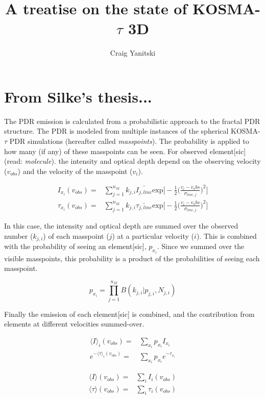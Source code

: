 \documentclass[amsmath,align]{paper}
\title{A treatise on the state of KOSMA-$\tau$ 3D}
\author{Craig Yanitski}
\date{}
\begin{document}
  \maketitle
  \section{From Silke's thesis...}
  The PDR emission is calculated from a probabilistic approach to the fractal PDR structure. The PDR is modeled from multiple instances of the spherical KOSMA-$\tau$ PDR simulations (hereafter called \textit{masspoints}). The probability is applied to how many (if any) of these masspoints can be seen. For observed element[sic] (read: \textit{molecule}). the intensity and optical depth depend on the observing velocity ($v_{obs}$) and the velocity of the masspoint ($v_i$).
  
  \begin{align}
    I_{x_i}(v_{obs}) =& \sum_{j=1}^{n_M} k_{j,i} \bar{I_{j,line}} \mathrm{exp}\big[-\frac{1}{2}\big(\frac{v_i-v_obs}{\sigma_{line,j}}\big)^2\big] \\
    \tau_{x_i}(v_{obs}) =& \sum_{j=1}^{n_M} k_{j,i} \bar{\tau_{j,line}} \mathrm{exp}\big[-\frac{1}{2}\big(\frac{v_i-v_obs}{\sigma_{line,j}}\big)^2\big]
  \end{align}
  
  In this case, the intensity and optical depth are summed over the observed number ($k_{j,i}$) of each masspoint ($j$) at a particular velocity ($i$). This is combined with the probability of seeing an element[sic], $p_{x_i}$. Since we summed over the visible masspoints, this probability is a product of the probabilities of seeing each masspoint.
  
  \begin{equation}
    p_{x_i} = \prod_{j=1}^{n_M} B(k_{j,i}|p_{j,i}, N_{j,i})
  \end{equation}
  
  Finally the emission of each element[sic] is combined, and the contribution from elements at different velocities summed-over.
  
  \begin{align}
    \langle I \rangle_i(v_{obs}) =& \sum_{x_i} p_{x_i} I_{x_i} \\
    e^{-\langle \tau \rangle_i(v_{obs})} =& \sum_{x_i} p_{x_i} e^{-\tau_{x_i}}
  \end{align}
  
  \begin{align}
    \langle I \rangle(v_{obs}) =& \sum_{i} I_i(v_{obs}) \\
    \langle \tau \rangle(v_{obs}) =& \sum_{i} \tau_i(v_{obs})
  \end{align}
  
\end{document}
